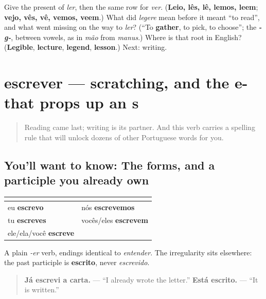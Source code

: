 \begin{tcolorbox}[breakable,colback=teal!4,colframe=teal!35!black,title={Before you move on}]
Give the present of \emph{ler}, then the same row for \emph{ver}. (\textbf{Leio, lês, lê, lemos, leem}; \textbf{vejo, vês, vê, vemos, veem}.) What did \emph{legere} mean before it meant \textquotedblleft{}to read\textquotedblright{}, and what went missing on the way to \emph{ler}? (\textquotedblleft{}To \textbf{gather}, to pick, to choose\textquotedblright{}; the \emph{\textbf{-g-}}, between vowels, as in \emph{mão} from \emph{manus}.) Where is that root in English? (\textbf{Legible}, \textbf{lecture}, \textbf{legend}, \textbf{lesson}.) Next: writing.
\end{tcolorbox}
\section[escrever]{escrever — scratching, and the e- that props up an s}

\label{lesson:PT-C19-escrever}



\begin{quote}
Reading came last; writing is its partner. And this verb carries a spelling rule that will unlock dozens of other Portuguese words for you.
\end{quote}

\subsection*{You'll want to know: The forms, and a participle you already own}
\noindent
\begin{tabularx}{\linewidth}{@{}>{\raggedright\arraybackslash}X>{\raggedright\arraybackslash}X@{}}
\toprule
\textbf{} & \textbf{} \\
\midrule
eu \textbf{escrevo} & nós \textbf{escrevemos} \\
tu \textbf{escreves} & vocês/eles \textbf{escrevem} \\
ele/ela/você \textbf{escreve} &  \\
\bottomrule
\end{tabularx}

A plain \emph{-er} verb, endings identical to \emph{entender}. The irregularity sits elsewhere: the past participle is \textbf{escrito}, never \emph{escrevido}.

\begin{quote}
\textbf{Já escrevi a carta.} — \textquotedblleft{}I already wrote the letter.\textquotedblright{} \textbf{Está escrito.} — \textquotedblleft{}It is written.\textquotedblright{}
\end{quote}


